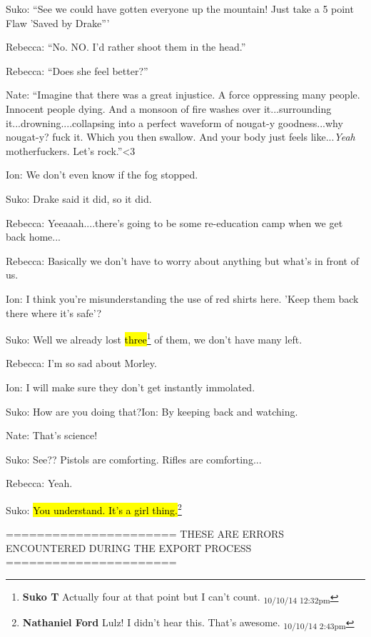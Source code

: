 Suko: ``See we could have gotten everyone up the mountain!  Just take a 5 point Flaw 'Saved by Drake''' 

Rebecca: ``No.  NO.  I'd rather shoot them in the head.''



Rebecca: ``Does she feel better?''

Nate: ``Imagine that there was a great injustice.  A force oppressing many people.  Innocent people dying. And a monsoon of fire washes over it...surrounding it...drowning....collapsing into a perfect waveform of nougat-y goodness...why nougat-y?  fuck it.  Which you then swallow.  And your body just feels like...\textit{Yeah} motherfuckers.  Let's rock.''\textless 3



Ion: We don't even know if the fog stopped.

Suko: Drake said it did, so it did.

Rebecca: Yeeaaah....there's going to be some re-education camp when we get back home...



Rebecca: Basically we don't have to worry about anything but what's in front of us.

Ion: I think you're misunderstanding the use of red shirts here.  'Keep them back there where it's safe'?

Suko: Well we already lost \hl{three}\footnote{\textbf{Suko T }Actually four at that point but I can't count. \textsubscript{10/10/14 12:32pm}} of them, we don't have many left.

Rebecca: I'm so sad about Morley.



Ion: I will make sure they don't get instantly immolated.

Suko: How are you doing that?Ion: By keeping back and watching.

Nate: That's science!



Suko: See??  Pistols are comforting.  Rifles are comforting...

Rebecca: Yeah.

Suko: \hl{You understand.  It's a girl thing.}\footnote{\textbf{Nathaniel Ford }Lulz! I didn't hear this. That's awesome. \textsubscript{10/10/14 2:43pm}}


\iffalse

======================
THESE ARE ERRORS ENCOUNTERED DURING THE EXPORT PROCESS
======================

